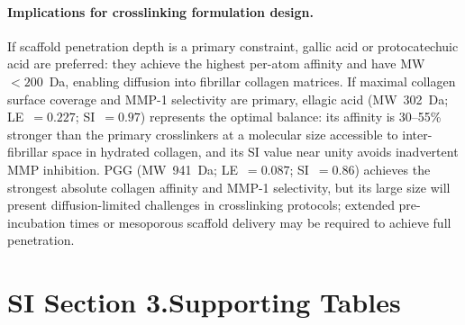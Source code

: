 \documentclass[11pt]{article}
\begin{document}
\paragraph{Implications for crosslinking formulation design.}
If scaffold penetration depth is a primary constraint, gallic acid or
protocatechuic acid are preferred: they achieve the highest per-atom affinity
and have MW~$< 200$~Da, enabling diffusion into fibrillar collagen matrices.
If maximal collagen surface coverage and MMP-1 selectivity are primary,
ellagic acid (MW~302~Da; LE~$= 0.227$; SI~$= 0.97$) represents the optimal
balance: its affinity is 30--55\% stronger than the primary crosslinkers
at a molecular size accessible to inter-fibrillar space in hydrated collagen,
and its SI value near unity avoids inadvertent MMP inhibition.
PGG (MW~941~Da; LE~$= 0.087$; SI~$= 0.86$) achieves the strongest absolute
collagen affinity and MMP-1 selectivity, but its large size will present
diffusion-limited challenges in crosslinking protocols; extended pre-incubation
times or mesoporous scaffold delivery may be required to achieve full penetration.

\label{si:results_end}

\section*{SI Section 3.\quad Supporting Tables}
\label{si:tables}
\end{document}
